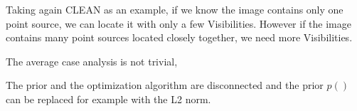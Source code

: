Taking again CLEAN as an example, if we know the image contains only one point source, we can locate it with only a few Visibilities. However if the image contains many point sources located closely together, we need more Visibilities.

The average case analysis is not trivial, 

The prior and the optimization algorithm are disconnected and the prior $p()$ can be replaced for example with the L2 norm.








